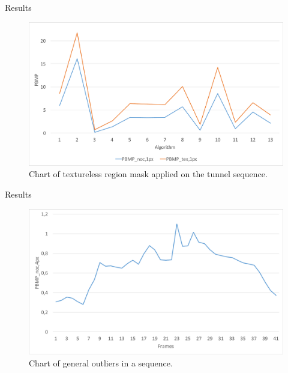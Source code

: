 \documentclass[10pt]{beamer}
\begin{document}
\begin{frame}[fragile]{Results}
  \begin{figure}[h!]
  \centering
  \includegraphics[width=1.0\textwidth]{../paper/src/images/evaluation/plots/05-tunnel-pbmp-tex-1.pdf}
  \caption{Chart of textureless region mask applied on the tunnel sequence.}
  \end{figure}
\end{frame}

\begin{frame}[fragile]{Results}
  \begin{figure}[h!]
  \centering
  \includegraphics[width=1.0\textwidth]{../paper/src/images/evaluation/plots/01-book-general-outliers.pdf}
  \caption{Chart of general outliers in a sequence.}
  \end{figure}
\end{frame}
\end{document}
